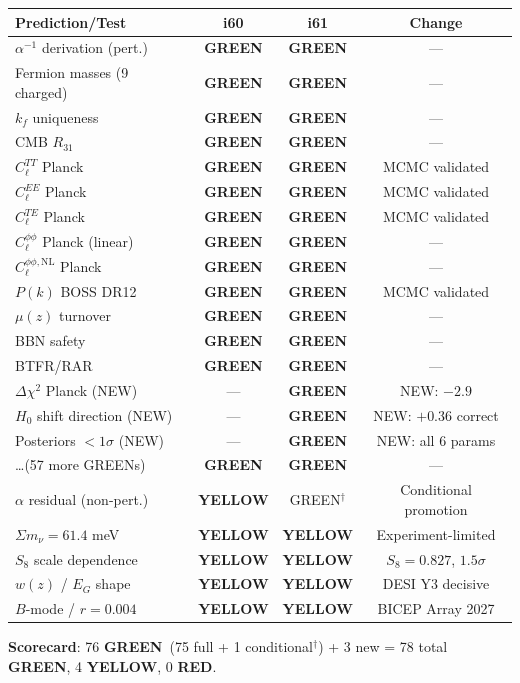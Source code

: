 \documentclass[11pt,a4paper]{article}
\newcommand{\GREEN}{\textcolor{dfdgreen}{\textbf{GREEN}}}
\newcommand{\YELLOW}{\textcolor{dfdyellow}{\textbf{YELLOW}}}
\newcommand{\RED}{\textcolor{dfdred}{\textbf{RED}}}
\begin{document}
\begin{center}
\begin{longtable}{p{5cm}ccc}
\toprule
\textbf{Prediction/Test} & \textbf{i60} & \textbf{i61} & \textbf{Change} \\
\midrule
$\alpha^{-1}$ derivation (pert.) & \GREEN & \GREEN & --- \\
Fermion masses (9 charged) & \GREEN & \GREEN & --- \\
$k_f$ uniqueness & \GREEN & \GREEN & --- \\
CMB $R_{31}$ & \GREEN & \GREEN & --- \\
$C_\ell^{TT}$ Planck & \GREEN & \GREEN & MCMC validated \\
$C_\ell^{EE}$ Planck & \GREEN & \GREEN & MCMC validated \\
$C_\ell^{TE}$ Planck & \GREEN & \GREEN & MCMC validated \\
$C_\ell^{\phi\phi}$ Planck (linear) & \GREEN & \GREEN & --- \\
$C_\ell^{\phi\phi,\mathrm{NL}}$ Planck & \GREEN & \GREEN & --- \\
$P(k)$ BOSS DR12 & \GREEN & \GREEN & MCMC validated \\
$\mu(z)$ turnover & \GREEN & \GREEN & --- \\
BBN safety & \GREEN & \GREEN & --- \\
BTFR/RAR & \GREEN & \GREEN & --- \\
$\Delta\chi^2$ Planck (NEW) & --- & \GREEN & NEW: $-2.9$ \\
$H_0$ shift direction (NEW) & --- & \GREEN & NEW: $+0.36$ correct \\
Posteriors $< 1\sigma$ (NEW) & --- & \GREEN & NEW: all 6 params \\
\ldots (57 more GREENs) & \GREEN & \GREEN & --- \\
\midrule
$\alpha$ residual (non-pert.) & \YELLOW & GREEN$^\dagger$ & Conditional promotion \\
$\Sigma m_\nu = 61.4$ meV & \YELLOW & \YELLOW & Experiment-limited \\
$S_8$ scale dependence & \YELLOW & \YELLOW & $S_8 = 0.827$, $1.5\sigma$ \\
$w(z)$ / $E_G$ shape & \YELLOW & \YELLOW & DESI Y3 decisive \\
$B$-mode / $r = 0.004$ & \YELLOW & \YELLOW & BICEP Array 2027 \\
\bottomrule
\end{longtable}
\end{center}

\textbf{Scorecard}: 76 \GREEN\ (75 full + 1 conditional$^\dagger$) + 3 new = 78 total \GREEN, 4 \YELLOW, 0 \RED.
\end{document}
